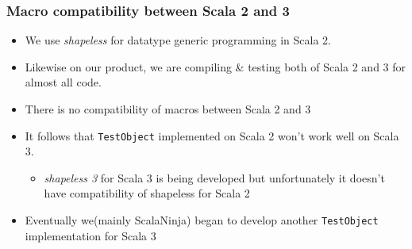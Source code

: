 \begin{frame}
  \frametitle{Macro compatibility between Scala 2 and 3}

  \begin{itemize}
    \item We use \emph{shapeless}\cite{shapeless_github} for datatype generic programming in Scala 2.

    \item Likewise on our product, we are compiling \& testing both of Scala 2 and 3 for almost all code.

    \item There is no compatibility of macros between Scala 2 and 3 

    \item It follows that \lstinline|TestObject| implemented on Scala 2 won't work well on Scala 3.
    \begin{itemize}
      \item \emph{shapeless 3}\cite{shapeless-3_github} for Scala 3 is being developed but unfortunately
      it doesn't have compatibility of shapeless for Scala 2
    \end{itemize}

    \item Eventually we(mainly ScalaNinja) began to develop another \lstinline|TestObject| implementation for Scala 3
  \end{itemize}

\end{frame}

